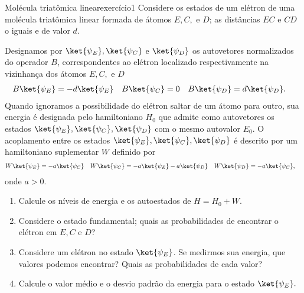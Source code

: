 \begin{exercício}{Molécula triatômica linear}{exercício1}
    Considere os estados de um elétron de uma molécula triatômica linear formada de átomos \(E, C, \) e \(D\); as distâncias \(EC\) e \(CD\) o iguais e de valor \(d\).
    \begin{center}
    \end{center}
    Designamos por \(\ket{\psi_E}, \ket{\psi_C}\) e \(\ket{\psi_D}\) os autovetores normalizados do operador \(B\), correspondentes ao elétron localizado respectivamente na vizinhança dos átomos \(E, C,\) e \(D\)
    \begin{align*}
        B\ket{\psi_E} &= - d\ket{\psi_E}&
        B\ket{\psi_C} &= 0&
        B\ket{\psi_D} &= d\ket{\psi_D}.
    \end{align*}
    Quando ignoramos a possibilidade do elétron saltar de um átomo para outro, sua energia é designada pelo hamiltoniano \(H_0\) que admite como autovetores os estados \(\ket{\psi_E}, \ket{\psi_C}, \ket{\psi_D}\) com o mesmo autovalor \(E_0\). O acoplamento entre os estados \(\ket{\psi_E}, \ket{\psi_C}, \ket{\psi_D}\) é descrito por um hamiltoniano suplementar \(W\) definido por
    \begin{align*}
        W \ket{\psi_E} &= -a \ket{\psi_C}&
        W \ket{\psi_C} &= -a \ket{\psi_E} - a \ket{\psi_D}&
        W \ket{\psi_D} &= -a \ket{\psi_C},
    \end{align*}
    onde \(a > 0\).
    \begin{enumerate}[label=(\alph*)]
        \item Calcule os níveis de energia e os autoestados de \(H = H_0 + W\).
        \item Considere o estado fundamental; quais as probabilidades de encontrar o elétron em \(E, C\) e \(D\)?
        \item Considere um elétron no estado \(\ket{\psi_E}\). Se medirmos sua energia, que valores podemos encontrar? Quais as probabilidades de cada valor?
        \item Calcule o valor médio e o desvio padrão da energia para o estado \(\ket{\psi_E}.\)
    \end{enumerate}
\end{exercício}
